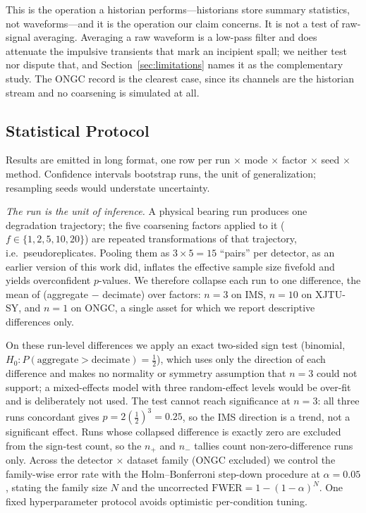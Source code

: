 \documentclass[IJPHM, 2026, 0]{PHMSociety}
\begin{document}
This is the operation a historian performs---historians store summary statistics, not waveforms---and it is the operation our claim concerns. It is not a test of raw-signal averaging. Averaging a raw waveform is a low-pass filter and does attenuate the impulsive transients that mark an incipient spall; we neither test nor dispute that, and Section~\ref{sec:limitations} names it as the complementary study. The ONGC record is the clearest case, since its channels are the historian stream and no coarsening is simulated at all.

\subsection{Statistical Protocol}
\label{sec:statproto}
Results are emitted in long format, one row per run $\times$ mode $\times$ factor $\times$ seed $\times$ method. Confidence intervals bootstrap runs, the unit of generalization; resampling seeds would understate uncertainty.

\emph{The run is the unit of inference.} A physical bearing run produces one degradation trajectory; the five coarsening factors applied to it ($f \in \{1, 2, 5, 10, 20\}$) are repeated transformations of that trajectory, i.e.\ pseudoreplicates. Pooling them as $3 \times 5 = 15$ ``pairs'' per detector, as an earlier version of this work did, inflates the effective sample size fivefold and yields overconfident $p$-values. We therefore collapse each run to one difference, the mean of (aggregate $-$ decimate) over factors: $n=3$ on IMS, $n=10$ on XJTU-SY, and $n=1$ on ONGC, a single asset for which we report descriptive differences only.

On these run-level differences we apply an exact two-sided sign test (binomial, $H_0 : P(\text{aggregate} > \text{decimate}) = \tfrac{1}{2}$), which uses only the direction of each difference and makes no normality or symmetry assumption that $n=3$ could not support; a mixed-effects model with three random-effect levels would be over-fit and is deliberately not used. The test cannot reach significance at $n=3$: all three runs concordant gives $p = 2(\tfrac{1}{2})^3 = 0.25$, so the IMS direction is a trend, not a significant effect. Runs whose collapsed difference is exactly zero are excluded from the sign-test count, so the $n_+$ and $n_-$ tallies count non-zero-difference runs only. Across the detector $\times$ dataset family (ONGC excluded) we control the family-wise error rate with the Holm--Bonferroni step-down procedure at $\alpha=0.05$, stating the family size $N$ and the uncorrected $\text{FWER} = 1 - (1-\alpha)^N$. One fixed hyperparameter protocol avoids optimistic per-condition tuning.
\end{document}
